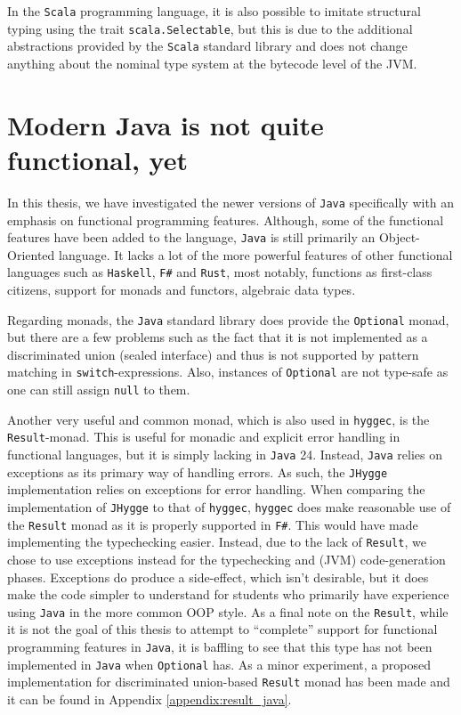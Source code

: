 In the \texttt{Scala} programming language, it is also possible to imitate structural typing using the trait \texttt{scala.Selectable}\cite{scala3}, but this is
due to the additional abstractions provided by the \texttt{Scala} standard library and does not change anything about the nominal
type system at the bytecode level of the JVM.

\section{Modern Java is not quite functional, yet}

In this thesis, we have investigated the newer versions of \texttt{Java} specifically with an emphasis on functional programming features.
Although, some of the functional features have been added to the language, \texttt{Java} is still primarily an Object-Oriented language.
It lacks a lot of the more powerful features of other functional languages such as \texttt{Haskell}, \texttt{F\#} and \texttt{Rust},
most notably, functions as first-class citizens, support for monads and functors, algebraic data types.

Regarding monads, the \texttt{Java} standard library does provide the \texttt{Optional} monad, but there are a few problems such as the
fact that it is not implemented as a discriminated union (sealed interface) and thus is not supported by pattern matching in
\texttt{switch}-expressions. Also, instances of \texttt{Optional} are not type-safe as one can still assign \texttt{null} to them.

Another very useful and common monad, which is also used in \texttt{hyggec}, is the \texttt{Result}-monad. This is useful for monadic
and explicit error handling in functional languages, but it is simply lacking in \texttt{Java} 24. Instead, \texttt{Java} relies on
exceptions as its primary way of handling errors. As such, the \texttt{JHygge} implementation relies on exceptions for error handling.
When comparing the implementation of \texttt{JHygge} to that of \texttt{hyggec}, \texttt{hyggec} does make reasonable use of the \texttt{Result}
monad as it is properly supported in \texttt{F\#}. This would have made implementing the typechecking easier. Instead, due to the lack
of \texttt{Result}, we chose to use exceptions instead for the typechecking and (JVM) code-generation phases. Exceptions do produce a
side-effect, which isn't desirable, but it does make the code simpler to understand for students who primarily have experience using
\texttt{Java} in the more common OOP style. As a final note on the \texttt{Result}, while it is not the goal of this thesis to attempt
to ``complete'' support for functional programming features in \texttt{Java}, it is baffling to see that this type has not been implemented
in \texttt{Java} when \texttt{Optional} has. As a minor experiment, a proposed implementation for discriminated union-based \texttt{Result}
monad has been made and it can be found in Appendix \ref{appendix:result_java}.

